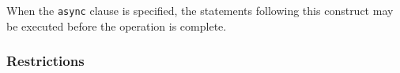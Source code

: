 
%



When the {\tt async} clause is specified, the statements following this
construct may be executed before the operation is complete.

\subsubsection*{Restrictions}

